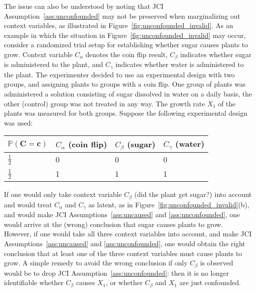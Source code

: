\documentclass[twoside,11pt]{article}
\newcommand{\Prb}{\mathbb{P}}
\newcommand\B[1]{\bm{#1}}
\newcommand{\Joris}[1]{{\color{blue}#1}}
\newcommand{\Sara}[1]{{\color{purple}#1}}
\begin{document}
The issue can also be understood by noting that JCI Assumption~\ref{ass:unconfounded} may not be preserved when marginalizing out context variables, as illustrated in Figure~\ref{fig:unconfounded_invalid}.
As an example in which the situation in Figure~\ref{fig:unconfounded_invalid} may occur, consider a randomized trial setup for establishing whether sugar causes plants to grow. Context variable $C_\alpha$ denotes the coin flip result, $C_\beta$ indicates whether sugar is administered to the plant, and $C_\gamma$ indicates whether water is administered to the plant. The experimenter decided to use an experimental design with two groups, and assigning plants to groups with a coin flip. One group of plants was administered a solution consisting of sugar dissolved in water on a daily basis, the other (control) group was not treated in any way. The growth rate $X_1$ of the plants was measured for both groups. Suppose the following experimental design was used:
\begin{center}\begin{tabular}{l|lll}
  $\Prb(\B{C}=\B{c})$ & $C_\alpha$ (coin flip) & $C_\beta$ (sugar) & $C_\gamma$ (water) \\
  \hline
  $\tfrac{1}{2}$ & 0      & 0       & 0 \\
  $\tfrac{1}{2}$ & 1      & 1       & 1 \\
\end{tabular}\end{center}
If one would only take context variable $C_\beta$ (did the plant get sugar?) into account and would treat $C_\alpha$ and $C_\gamma$ as latent, as in Figure~\ref{fig:unconfounded_invalid}(b), and would make JCI Assumptions~\ref{ass:uncaused} and \ref{ass:unconfounded}, one would arrive at the (wrong) conclusion that sugar causes plants to grow. However, if one would take all three context variables into account, and make JCI Assumptions~\ref{ass:uncaused} and \ref{ass:unconfounded}, one would obtain the right conclusion that at least one of the three context variables must cause plants to grow. A simple remedy to avoid the wrong conclusion if only $C_\beta$ is observed would be to drop JCI Assumption~\ref{ass:unconfounded}: then it is no longer identifiable whether $C_\beta$ causes $X_1$, or whether $C_\beta$ and $X_1$ are just confounded.
\end{document}
